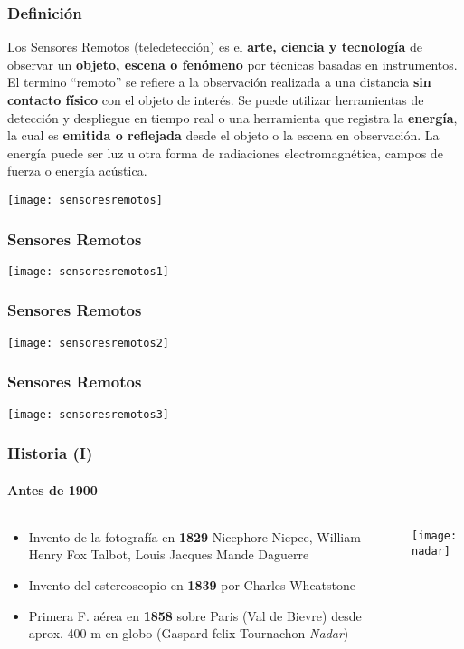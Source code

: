 \documentclass[]{beamer}
\begin{document}
\begin{frame}
\frametitle{Definición}
\justifying
\small{
Los Sensores Remotos (teledetección) es el \textbf{arte, ciencia y tecnología} de observar un \textbf{objeto, escena o fenómeno} por técnicas basadas en instrumentos. El termino “remoto” se refiere a la observación realizada a una distancia \textbf{sin contacto físico} con el objeto de interés. Se puede utilizar herramientas de detección y despliegue en tiempo real o una herramienta que registra la \textbf{energía}, la cual es \textbf{emitida o reflejada} desde el objeto o la escena en observación. La energía puede ser luz u otra forma de radiaciones electromagnética, campos de fuerza o energía acústica.\vfill
\begin{center}
\texttt{[image: sensoresremotos]}
\end{center}}
\end{frame}
\begin{frame}
\frametitle{Sensores Remotos}
\begin{center}
\texttt{[image: sensoresremotos1]}
\end{center}
\end{frame}
\begin{frame}
\frametitle{Sensores Remotos}
\begin{center}
\texttt{[image: sensoresremotos2]}
\end{center}
\end{frame}
\begin{frame}
\frametitle{Sensores Remotos}
\begin{center}
\texttt{[image: sensoresremotos3]}
\end{center}
\end{frame}
\begin{frame}
\frametitle{Historia (I)}
\framesubtitle{Antes de 1900}
\begin{columns}
\begin{column}{0.5\textwidth}
\begin{itemize}
\item Invento de la fotografía en \textbf{1829} Nicephore Niepce, William Henry Fox Talbot, Louis Jacques Mande Daguerre
\item Invento del estereoscopio en \textbf{1839} por  Charles Wheatstone
\item Primera F. aérea en \textbf{1858} sobre Paris (Val de Bievre) desde aprox. 400 m en globo (Gaspard-felix Tournachon \emph{Nadar})
\end{itemize}
\end{column}
\begin{column}{0.5\textwidth}
\begin{center}
\texttt{[image: nadar]}
\end{center}
\end{column}
\end{columns}
\end{frame}
\end{document}
